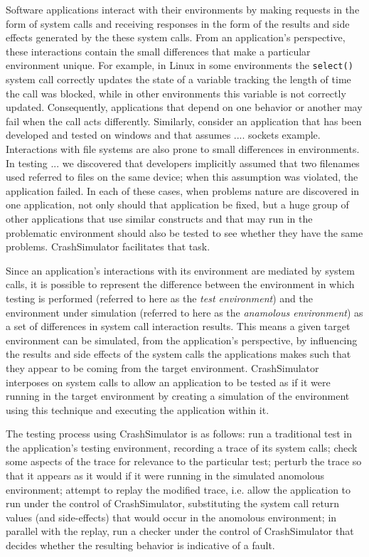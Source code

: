 Software applications interact with their environments by making requests in the form of system calls and receiving responses in the
form of the results and side effects generated by the these system calls.  From an application's perspective, these
interactions contain the small differences that make a particular environment unique.  For example, in Linux in some environments
the {\tt select()} system call correctly updates the state of a variable tracking the length of time the
call was blocked, while in other environments this variable is not correctly updated.  Consequently, applications that depend
on one behavior or another may fail when the call acts differently.  
Similarly, consider an application that has been developed and tested on windows
and that assumes .... sockets example.
Interactions with file systems are also prone to small differences in environments.
In testing ... we discovered that developers implicitly assumed that two filenames used referred to files on the same
device; when this assumption was violated, the application failed. 
In each of these cases, when problems nature are discovered in one application, not only should that application be fixed, but
a huge group of other applications that use similar constructs and that may run in the problematic environment should also
be tested to see whether they have the same problems. CrashSimulator facilitates that task.

Since an application's interactions with its environment are mediated by system calls,
it is possible to represent the difference between the environment in which testing is performed (referred to here
as the {\em test environment}) and the environment under simulation (referred to here as the {\em anamolous environment})
as a set of differences in system call interaction results. 
This means
a given target environment can be simulated, from the application's perspective, by influencing the results and side
effects of the system calls the applications makes such that they appear to be coming from the target environment.
CrashSimulator interposes on system calls to allow an application to
be tested as if it were running in the target environment by creating a simulation of
the environment using this technique and executing the application within it.

The testing process using CrashSimulator is as follows:
	run a traditional test in the application's testing environment, recording a trace of its system calls;
	check some aspects of the trace for relevance to the particular test;
		perturb the trace so that it appears as it would if it were running in the simulated anomolous environment;
		attempt to replay the modified trace, i.e. allow the application to run under the control of CrashSimulator, substituting the system call return values (and side-effects) that would occur in the anomolous environment;
		in parallel with the replay, run a checker under the control of CrashSimulator that decides whether the resulting behavior is indicative of a fault.


